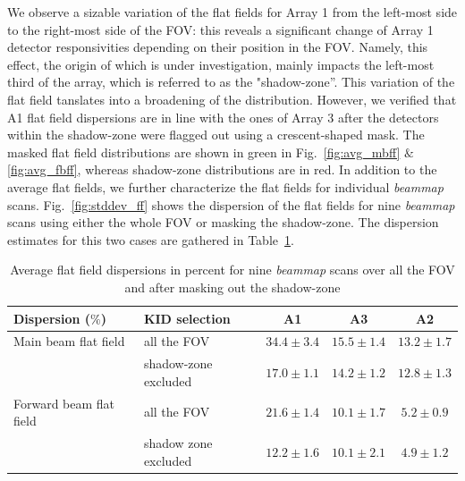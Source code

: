 We observe a sizable variation of the flat fields for Array 1 from the left-most side to the right-most side of the FOV: this reveals a significant change of Array 1 detector responsivities depending on their position in the FOV. Namely, this effect, the origin of which is under investigation, mainly impacts the left-most third of the array, which is referred to as the "shadow-zone''. This variation of the flat field tanslates into a broadening of the distribution. However, we verified that A1 flat field dispersions are in line with the ones of Array 3 after the detectors within the shadow-zone were flagged out using a crescent-shaped mask. The masked flat field distributions are shown in green in Fig.~\ref{fig:avg_mbff} $\&$ \ref{fig:avg_fbff}, whereas shadow-zone distributions are in red. In addition to the average flat fields, we further characterize the flat fields for individual \emph{beammap} scans. Fig.~\ref{fig:stddev_ff} shows the dispersion of the flat fields for nine \emph{beammap} scans using either the whole FOV or masking the shadow-zone. The dispersion estimates for this two cases are gathered in Table~\ref{tab:flatfields}.      

\begin{table}[h]
\begin{center}
\begin{tabular}{|l|l|c|c|c|}
\hline
 Dispersion ($\%$)    & KID selection  &  A1 & A3  & A2 \\
\hline
Main beam flat field  & all the FOV           & $34.4 \pm 3.4$    & $15.5 \pm 1.4$  &  $13.2 \pm 1.7$  \\
                      & shadow-zone excluded  & $17.0 \pm 1.1$    & $14.2 \pm 1.2$  &  $12.8 \pm 1.3$\\
\hline
Forward beam flat field  & all the FOV           & $21.6 \pm 1.4$  & $10.1 \pm 1.7$  & $5.2 \pm 0.9$   \\
                         & shadow zone excluded  & $12.2 \pm 1.6$  & $10.1 \pm 2.1$  & $4.9 \pm 1.2$ \\
\hline
\end{tabular}
\caption{Average flat field dispersions in percent for nine \emph{beammap} scans over all the FOV and after masking out the shadow-zone}
\end{center}
\label{tab:flatfields}
\end{table}


